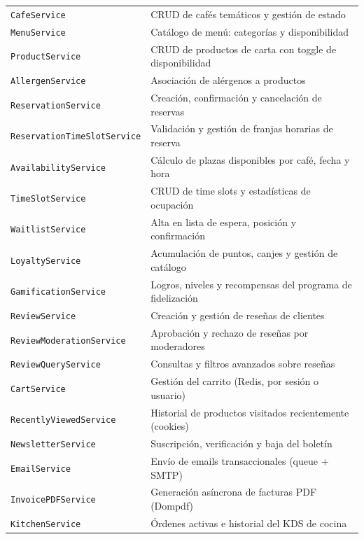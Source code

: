 \documentclass[12pt,a4paper,twoside,openright]{report}
\begin{document}
\begin{longtable}{@{}lp{8cm}@{}}
  \texttt{CafeService}                 & CRUD de cafés temáticos y gestión de estado\\
  \texttt{MenuService}                 & Catálogo de menú: categorías y disponibilidad\\
  \texttt{ProductService}              & CRUD de productos de carta con toggle de disponibilidad\\
  \texttt{AllergenService}             & Asociación de alérgenos a productos\\
  \texttt{ReservationService}          & Creación, confirmación y cancelación de reservas\\
  \texttt{ReservationTimeSlotService}  & Validación y gestión de franjas horarias de reserva\\
  \texttt{AvailabilityService}         & Cálculo de plazas disponibles por café, fecha y hora\\
  \texttt{TimeSlotService}             & CRUD de time slots y estadísticas de ocupación\\
  \texttt{WaitlistService}             & Alta en lista de espera, posición y confirmación\\
  \texttt{LoyaltyService}              & Acumulación de puntos, canjes y gestión de catálogo\\
  \texttt{GamificationService}         & Logros, niveles y recompensas del programa de fidelización\\
  \texttt{ReviewService}               & Creación y gestión de reseñas de clientes\\
  \texttt{ReviewModerationService}     & Aprobación y rechazo de reseñas por moderadores\\
  \texttt{ReviewQueryService}          & Consultas y filtros avanzados sobre reseñas\\
  \texttt{CartService}                 & Gestión del carrito (Redis, por sesión o usuario)\\
  \texttt{RecentlyViewedService}       & Historial de productos visitados recientemente (cookies)\\
  \texttt{NewsletterService}           & Suscripción, verificación y baja del boletín\\
  \texttt{EmailService}                & Envío de emails transaccionales (queue + SMTP)\\
  \texttt{InvoicePDFService}           & Generación asíncrona de facturas PDF (Dompdf)\\
  \texttt{KitchenService}              & Órdenes activas e historial del KDS de cocina\\

\end{longtable}
\end{document}
